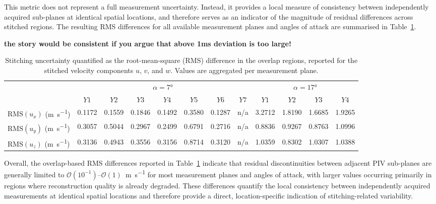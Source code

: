 \documentclass[wes, manuscript]{copernicus}
\begin{document}
This metric does not represent a full measurement uncertainty.
Instead, it provides a local measure of consistency between independently acquired sub-planes at identical spatial locations, and therefore serves as an indicator of the magnitude of residual differences across stitched regions.
The resulting RMS differences for all available measurement planes and angles of attack are summarised in Table~\ref{tab:stitching_uncertainty_flipped}.

\textbf{the story would be consistent if you argue that above 1ms deviation is too large!}

%
\begin{table}[htp]
    \centering
    \caption{Stitching uncertainty quantified as the root-mean-square (RMS) difference in the overlap regions, reported for the stitched velocity components $u$, $v$, and $w$. Values are aggregated per measurement plane.}
    \begin{tabular}{l ccccccc cccc}
    \hline
    & \multicolumn{7}{c}{$\alpha = 7\unit{\degree}$}
    & \multicolumn{4}{c}{$\alpha = 17\unit{\degree}$} \\
     & $Y1$ & $Y2$ & $Y3$ & $Y4$ & $Y5$ & $Y6$ & $Y7$
     & $Y1$ & $Y2$ & $Y3$ & $Y4$ \\
    \hline
    $\mathrm{RMS}(u_x)$ (\unit{m s^{-1}})
    & 0.1172 & 0.1559 & 0.1846 & 0.1492 & 0.3580 & 0.1287 & n/a
    & 3.2712 & 1.8190 & 1.6685 & 1.9265 \\
    $\mathrm{RMS}(u_y)$ (\unit{m s^{-1}})
    & 0.3057 & 0.5044 & 0.2967 & 0.2499 & 0.6791 & 0.2716 & n/a
    & 0.8836 & 0.9267 & 0.8763 & 1.0996 \\
    $\mathrm{RMS}(u_z)$ (\unit{m s^{-1}})
    & 0.3136 & 0.4943 & 0.3556 & 0.3156 & 0.8714 & 0.3120 & n/a
    & 1.0359 & 0.8302 & 1.0307 & 1.0388 \\
    \hline
    \end{tabular}
    \label{tab:stitching_uncertainty_flipped}
\end{table}


Overall, the overlap-based RMS differences reported in Table~\ref{tab:stitching_uncertainty_flipped} indicate that residual discontinuities between adjacent PIV sub-planes are generally limited to $\mathcal{O}(10^{-1})$–$\mathcal{O}(1)$~\unit{m s^{-1}} for most measurement planes and angles of attack, with larger values occurring primarily in regions where reconstruction quality is already degraded. These differences quantify the local consistency between independently acquired measurements at identical spatial locations and therefore provide a direct, location-specific indication of stitching-related variability. 
\end{document}
